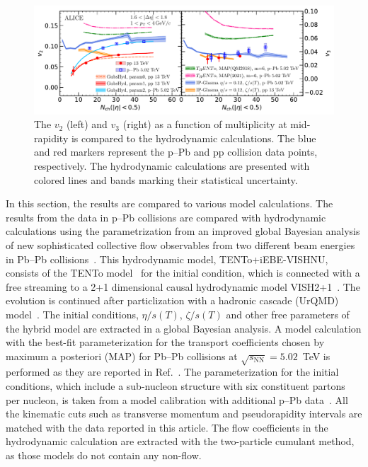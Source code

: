 \begin{figure}[h!]
	\centering
	\includegraphics[width=1.0\textwidth]{figures/Fig6_v2Mult_allSystems_Hydro.pdf} 
	\caption{The $v_2$ (left) and $v_3$ (right) as a function of multiplicity at mid-rapidity is compared to the hydrodynamic calculations. The blue and red markers represent the p--Pb and pp collision data points, respectively. The hydrodynamic calculations are presented with colored lines and bands marking their statistical uncertainty.} 
	\label{fig:vnmult_model}
\end{figure}

In this section, the results are compared to various model calculations.
The results from the data in p--Pb collisions are compared with hydrodynamic calculations using the parametrization from an improved global
Bayesian analysis of new sophisticated collective flow observables
 from two different beam energies in Pb--Pb collisions~\cite{Parkkila:2021yha}. This hydrodynamic model, {TENTo}+iEBE-VISHNU, consists of the {TENTo} model~\cite{Moreland:2014oya} for the initial condition, which is connected with a free streaming to a 2+1 dimensional causal hydrodynamic model VISH2+1~\cite{Shen:2014vra}. The evolution is continued after particlization with a hadronic cascade (UrQMD) model~\cite{Bass:1998ca,Bleicher:1999xi}. The initial conditions, $\eta/s(T)$, $\zeta/s(T)$ and other free parameters of the hybrid model are extracted in a global Bayesian analysis.
A model calculation with the best-fit parameterization for the transport coefficients chosen by maximum a posteriori (MAP) for Pb--Pb collisions at $\sqrt{s_{\text{NN}}}=5.02$~TeV is performed as they are reported in Ref.~\cite{Parkkila:2021yha}. The parameterization for the initial conditions, which include a sub-nucleon structure with six constituent partons per nucleon, is taken from a model calibration with additional p--Pb data~\cite{Moreland:2018gsh}. All the kinematic cuts such as transverse momentum and pseudorapidity intervals are matched with the data reported in this article. The flow coefficients in the hydrodynamic calculation are extracted with the two-particle cumulant method, as those models do not contain any non-flow. %

